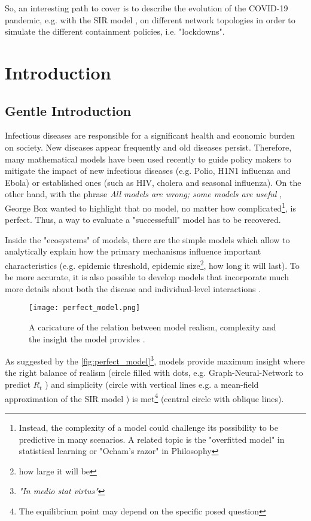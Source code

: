 \documentclass[a4paper,11pt,twoside]{book} %
\begin{document}
So, an interesting path to cover is to describe the evolution of the COVID-19 pandemic, e.g. with the SIR model \cite{pizzuti::2020_ItalyCOVIDnetwork}, on different network topologies in order to simulate the different containment policies, i.e. "lockdowns".


\chapter[Introduction]{Introduction}
%


\section{Gentle Introduction}
Infectious diseases are responsible for a significant health and economic burden on society. New diseases appear frequently and old diseases persist. Therefore, many mathematical models have been used recently to guide policy makers to mitigate the impact of new infectious diseases (e.g. Polio, H1N1 influenza and Ebola) or established ones (such as HIV, cholera and seasonal influenza).
On the other hand, with the phrase \textit{All models are wrong; some models are useful} \cite{Box::2005_StatDesign}, George Box wanted to highlight that no model, no matter how complicated\footnote{Instead, the complexity of a model could challenge its possibility to be predictive in many scenarios. A related topic is the "overfitted model" in statistical learning or "Ocham's razor" in Philosophy}, is perfect. Thus, a way to evaluate a "successefull" model has to be recovered.

Inside the "ecosystems" of models, there are the simple models which allow to analytically explain how the primary mechanisms influence important characteristics (e.g. epidemic threshold, epidemic size\footnote{how large it will be}, how long it will last). To be more accurate, it is also possible to develop models that incorporate much more details about both the disease and individual-level interactions \cite{Kiss::MathOfEpiOnNet}.

\begin{figure}[htbp]
	\centering
	\texttt{[image: perfect\_model.png]}
	\caption{A caricature of the relation between model realism, complexity and the
	insight the model provides \cite{Kiss::MathOfEpiOnNet}.}
	\label{fig:perfect_model}
\end{figure}	

As suggested by the \autoref{fig:perfect_model}\footnote{\textit{"In medio stat virtus"}}, models provide maximum insight where the right balance of realism (circle filled with dots, e.g. Graph-Neural-Network to predict $R_t$ \cite{Davahli::USA_predicting_COVID19}) and simplicity (circle with vertical lines e.g. a mean-field approximation of the SIR model \cite{Kiss::Ch1MathOfEpiOnNet}) is met\footnote{The equilibrium point may depend on the specific posed question} (central circle with oblique lines).
\end{document}
